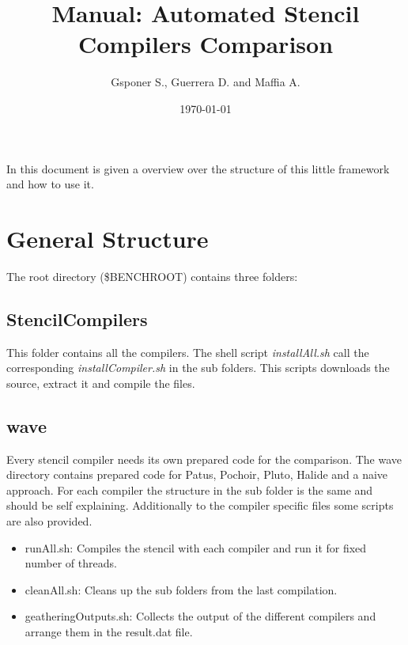 \documentclass[AEJ]{AEA}
\begin{document}
\title{Manual: Automated Stencil Compilers Comparison}
\author{Gsponer S., Guerrera D. and Maffia A.}
\date{\today}


\begin{abstract}

\end{abstract}

\maketitle

In this document is given a overview over the structure of this little framework and how to use it. 

\section{General Structure}
The root directory (\$BENCHROOT) contains three folders:


\subsection{StencilCompilers}
This folder contains all the compilers. The shell script \emph{installAll.sh} call the corresponding \emph{installCompiler.sh} in the sub folders. This scripts downloads the source, extract it and compile the files.  

\subsection{wave}
Every stencil compiler needs its own prepared code for the comparison. The wave directory contains prepared code for Patus, Pochoir, Pluto, Halide and a naive approach. For each compiler the structure in the sub folder is the same and should be self explaining. Additionally to the compiler specific files some scripts are also provided.\\
\begin{itemize}
	\item runAll.sh: Compiles the stencil with each compiler and run it for fixed number of threads. 
	\item cleanAll.sh: Cleans up the sub folders from the last compilation. 
	\item geatheringOutputs.sh: Collects the output of the different compilers and arrange them in the result.dat file.
\end{itemize}
\end{document}
